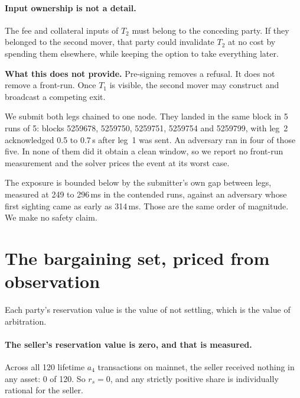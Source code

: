 \documentclass[11pt]{article}
\theoremstyle{remark}
\begin{document}
\paragraph{Input ownership is not a detail.} The fee and collateral inputs of $T_2$ must belong to the conceding
party. If they belonged to the second mover, that party could invalidate $T_2$ at no cost by spending them elsewhere,
while keeping the option to take everything later.

\begin{caveat}
\textbf{What this does not provide.} Pre-signing removes a refusal. It does not remove a front-run. Once $T_1$ is
visible, the second mover may construct and broadcast a competing exit.

We submit both legs chained to one node. They landed in the same block in 5 runs of 5: blocks 5259678, 5259750,
5259751, 5259754 and 5259799, with leg~2 acknowledged 0.5 to 0.7\,s after leg~1 was sent. An adversary ran in four of
those five. In none of them did it obtain a clean window, so we report no front-run measurement and the solver prices
the event at its worst case.

The exposure is bounded below by the submitter's own gap between legs, measured at 249 to 296\,ms in the contended
runs, against an adversary whose first sighting came as early as 314\,ms. Those are the same order of magnitude. We
make no safety claim.
\end{caveat}

\section{The bargaining set, priced from observation}

Each party's reservation value is the value of not settling, which is the value of arbitration.

\paragraph{The seller's reservation value is zero, and that is measured.} Across all 120 lifetime $a_4$ transactions
on mainnet, the seller received nothing in any asset: 0 of 120. So $r_s = 0$, and any strictly positive share is
individually rational for the seller.
\end{document}
